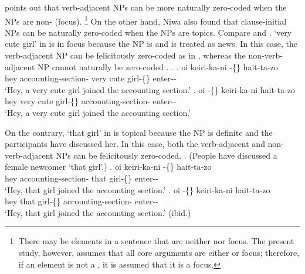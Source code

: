 points out that verb-adjacent NPs
can be more naturally zero-coded
when the NPs are non- (focus).%
 \footnote{
 There may be elements in a sentence that are
 neither  nor focus.
 The present study, however, assumes that all core arguments are
 either  or focus;
 therefore, if an element is not a ,
 it is assumed that it is a focus.
 }
On the other hand,
Niwa also found that clause-initial NPs can be naturally zero-coded
when the NPs are topics.
Compare \Next and \NNext.
 `very cute girl' in \Next is in focus
because the NP is  and is treated as news.
In this case,
the verb-adjacent NP can be felicitously zero-coded as in \Next[a],
whereas the non-verb-adjacent NP cannot naturally be zero-coded \Next[b].
%
\ex.
 \ag. oi keiri-ka-ni   -\{\} hait-ta-zo \\
      hey accounting-section- very cute girl-\{\} enter--\\
      `Hey, a very cute girl joined the accounting section.'
 \bg. oi   -\{\} keiri-ka-ni hait-ta-zo \\
      hey very cute girl-\{\} accounting-section- enter--\\
      `Hey, a very cute girl joined the accounting section.'
      \hfill{\cite[293]{niwa06}}

On the contrary,
 `that girl' in \Next is topical
because the NP is definite and the participants have discussed her.
In this case,
both the verb-adjacent and non-verb-adjacent NPs can be
felicitously zero-coded.
%
\ex. (People have discussed a female newcomer  `that girl'.)
 \ag. oi keiri-ka-ni  -\{\} hait-ta-zo \\
      hey accounting-section- that girl-\{\} enter--\\
      `Hey, that girl joined the accounting section.'
 \bg. oi  -\{\} keiri-ka-ni hait-ta-zo \\
      hey that girl-\{\} accounting-section- enter--\\
      `Hey, that girl joined the accounting section.'
      \hfill{(ibid.)}

